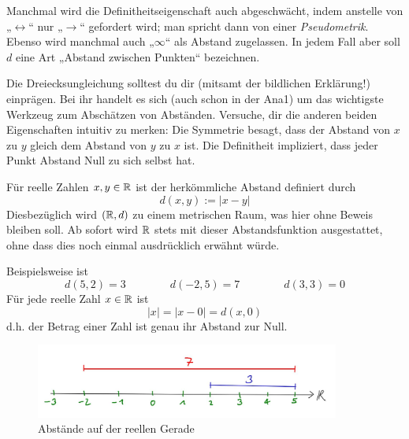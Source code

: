 \begin{bem}
    Manchmal wird die Definitheitseigenschaft auch abgeschwächt, indem anstelle von „$\leftrightarrow$“ nur „$\rightarrow$“ gefordert wird; man spricht dann von einer \emph{Pseudometrik}. Ebenso wird manchmal auch „$\infty$“ als Abstand zugelassen. In jedem Fall aber soll $d$ eine Art „Abstand zwischen Punkten“ bezeichnen.
    
    Die Dreiecksungleichung solltest du dir (mitsamt der bildlichen Erklärung!) einprägen. Bei ihr handelt es sich (auch schon in der Ana1) um das wichtigste Werkzeug zum Abschätzen von Abständen. Versuche, dir die anderen beiden Eigenschaften intuitiv zu merken: Die Symmetrie besagt, dass der Abstand von $x$ zu $y$ gleich dem Abstand von $y$ zu $x$ ist. Die Definitheit impliziert, dass jeder Punkt Abstand Null zu sich selbst hat.
\end{bem}


\begin{defin}[Abstand in $\R$]
    Für reelle Zahlen $x,y\in \mathbb R$ ist der herkömmliche Abstand definiert durch
        \[ d(x,y) := \vert x -y\vert \]
    Diesbezüglich wird $(\mathbb R,d)$ zu einem metrischen Raum, was hier ohne Beweis bleiben soll. %
    Ab sofort wird $\R$ stets mit dieser Abstandsfunktion ausgestattet, ohne dass dies noch einmal ausdrücklich erwähnt würde.
\end{defin}


\begin{bsp}
    Beispielsweise ist
        \[ d(5,2)= 3 \qquad\qquad d(-2,5)=7 \qquad\qquad d(3,3)=0 \]
    Für jede reelle Zahl $x\in \mathbb R$ ist
        \[ \vert x\vert = \vert x-0\vert = d(x,0) \]
    d.h. der Betrag einer Zahl ist genau ihr Abstand zur Null. 
    \begin{figure}[ht]
        \includegraphics[width=10cm]{./_img/Abstand.jpeg}
        \centering \caption{Abstände auf der reellen Gerade}
    \end{figure}
\end{bsp}


